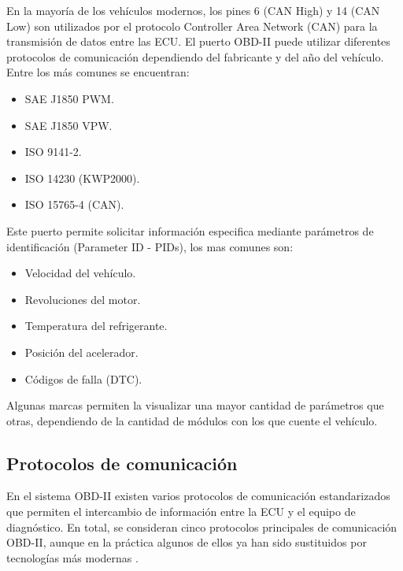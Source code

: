 En  la mayoría de los vehículos modernos, los pines 6 (CAN High) y 14 (CAN Low) son utilizados por el protocolo Controller Area Network (CAN) para la transmisión de datos entre las ECU. El puerto OBD-II puede utilizar diferentes protocolos de comunicación dependiendo del fabricante y del año del vehículo. Entre los más comunes se encuentran:
\begin{itemize}
    \item SAE J1850 PWM.
    \item SAE J1850 VPW.
    \item ISO 9141-2.
    \item ISO 14230 (KWP2000).
    \item ISO 15765-4 (CAN).
\end{itemize}

Este puerto permite solicitar información especifica mediante parámetros de identificación (Parameter ID - PIDs), los mas comunes son: 
\begin{itemize}
    \item Velocidad del vehículo.
    \item Revoluciones del motor.
    \item Temperatura del refrigerante.
    \item Posición del acelerador.
    \item Códigos de falla (DTC).
\end{itemize}
Algunas marcas permiten la visualizar una mayor cantidad de parámetros que otras, dependiendo de la cantidad de módulos con los que cuente el vehículo.
\subsection{Protocolos de comunicación}%

En el sistema OBD-II existen varios protocolos de comunicación estandarizados que permiten el intercambio de información entre la ECU y el equipo de diagnóstico. En total, se consideran cinco protocolos principales de comunicación OBD-II, aunque en la práctica algunos de ellos ya han sido sustituidos por tecnologías más modernas \citep{Autoavance_OBD2, Autosoporte_OBDII, Flexihub_OBD2}.

